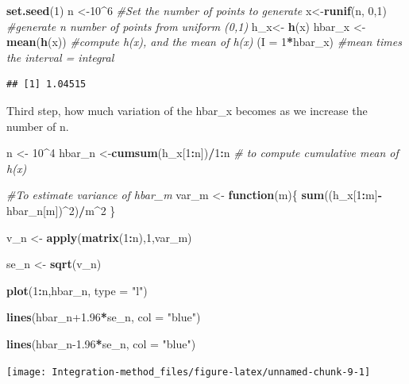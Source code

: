 \documentclass[
]{article}
\newenvironment{Shaded}{\begin{snugshade}}{\end{snugshade}}
\newcommand{\AttributeTok}[1]{\textcolor[rgb]{0.13,0.29,0.53}{#1}}
\newcommand{\CommentTok}[1]{\textcolor[rgb]{0.56,0.35,0.01}{\textit{#1}}}
\newcommand{\ControlFlowTok}[1]{\textcolor[rgb]{0.13,0.29,0.53}{\textbf{#1}}}
\newcommand{\DecValTok}[1]{\textcolor[rgb]{0.00,0.00,0.81}{#1}}
\newcommand{\FloatTok}[1]{\textcolor[rgb]{0.00,0.00,0.81}{#1}}
\newcommand{\FunctionTok}[1]{\textcolor[rgb]{0.13,0.29,0.53}{\textbf{#1}}}
\newcommand{\NormalTok}[1]{#1}
\newcommand{\OtherTok}[1]{\textcolor[rgb]{0.56,0.35,0.01}{#1}}
\newcommand{\SpecialCharTok}[1]{\textcolor[rgb]{0.81,0.36,0.00}{\textbf{#1}}}
\newcommand{\StringTok}[1]{\textcolor[rgb]{0.31,0.60,0.02}{#1}}
\begin{document}
\begin{Shaded}
\begin{Highlighting}[]
\FunctionTok{set.seed}\NormalTok{(}\DecValTok{1}\NormalTok{) }
\NormalTok{n }\OtherTok{\textless{}{-}}\DecValTok{10}\SpecialCharTok{\^{}}\DecValTok{6} \CommentTok{\#Set the number of points to generate}
\NormalTok{x}\OtherTok{\textless{}{-}}\FunctionTok{runif}\NormalTok{(n, }\DecValTok{0}\NormalTok{,}\DecValTok{1}\NormalTok{) }\CommentTok{\#generate n number of points from uniform (0,1)}
\NormalTok{h\_x}\OtherTok{\textless{}{-}} \FunctionTok{h}\NormalTok{(x)}
\NormalTok{hbar\_x }\OtherTok{\textless{}{-}} \FunctionTok{mean}\NormalTok{(}\FunctionTok{h}\NormalTok{(x)) }\CommentTok{\#compute h(x), and the mean of h(x)}
\NormalTok{(}\AttributeTok{I =} \DecValTok{1}\SpecialCharTok{*}\NormalTok{hbar\_x) }\CommentTok{\#mean times the interval = integral}
\end{Highlighting}
\end{Shaded}

\begin{verbatim}
## [1] 1.04515
\end{verbatim}

Third step, how much variation of the hbar\_x becomes as we increase the
number of n.

\begin{Shaded}
\begin{Highlighting}[]
\NormalTok{n }\OtherTok{\textless{}{-}} \DecValTok{10}\SpecialCharTok{\^{}}\DecValTok{4}
\NormalTok{hbar\_n }\OtherTok{\textless{}{-}}\FunctionTok{cumsum}\NormalTok{(h\_x[}\DecValTok{1}\SpecialCharTok{:}\NormalTok{n])}\SpecialCharTok{/}\DecValTok{1}\SpecialCharTok{:}\NormalTok{n }\CommentTok{\# to compute cumulative mean of h(x)}

\CommentTok{\#To estimate variance of hbar\_m}
\NormalTok{var\_m }\OtherTok{\textless{}{-}} \ControlFlowTok{function}\NormalTok{(m)\{}
  \FunctionTok{sum}\NormalTok{((h\_x[}\DecValTok{1}\SpecialCharTok{:}\NormalTok{m]}\SpecialCharTok{{-}}\NormalTok{hbar\_n[m])}\SpecialCharTok{\^{}}\DecValTok{2}\NormalTok{)}\SpecialCharTok{/}\NormalTok{m}\SpecialCharTok{\^{}}\DecValTok{2}
\NormalTok{\}}

\NormalTok{v\_n }\OtherTok{\textless{}{-}} \FunctionTok{apply}\NormalTok{(}\FunctionTok{matrix}\NormalTok{(}\DecValTok{1}\SpecialCharTok{:}\NormalTok{n),}\DecValTok{1}\NormalTok{,var\_m)}

\NormalTok{se\_n }\OtherTok{\textless{}{-}} \FunctionTok{sqrt}\NormalTok{(v\_n)}

\FunctionTok{plot}\NormalTok{(}\DecValTok{1}\SpecialCharTok{:}\NormalTok{n,hbar\_n, }\AttributeTok{type =} \StringTok{"l"}\NormalTok{)}

\FunctionTok{lines}\NormalTok{(hbar\_n}\FloatTok{+1.96}\SpecialCharTok{*}\NormalTok{se\_n, }\AttributeTok{col =} \StringTok{"blue"}\NormalTok{)}

\FunctionTok{lines}\NormalTok{(hbar\_n}\FloatTok{{-}1.96}\SpecialCharTok{*}\NormalTok{se\_n, }\AttributeTok{col =} \StringTok{"blue"}\NormalTok{)}
\end{Highlighting}
\end{Shaded}

\begin{center}\texttt{[image: Integration-method\_files/figure-latex/unnamed-chunk-9-1]} \end{center}
\end{document}
